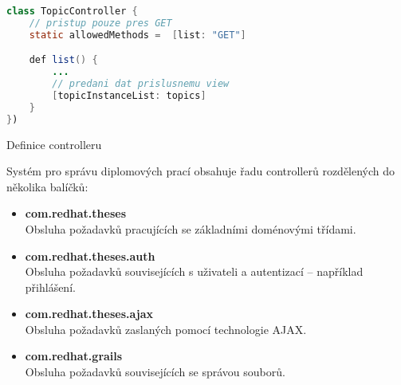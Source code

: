 \begin{example}
\centering
\begin{lstlisting}[language=Java]
class TopicController {
    // pristup pouze pres GET
    static allowedMethods =  [list: "GET"]

    def list() {
        ...
        // predani dat prislusnemu view
        [topicInstanceList: topics]
    }
})
\end{lstlisting}
\caption{Definice controlleru}
\end{example}


Systém pro správu diplomových prací obsahuje řadu controllerů rozdělených do několika balíčků:
\begin{itemize}
\item \textbf{com.redhat.theses} \\
Obsluha požadavků pracujících se základními doménovými třídami.
\item \textbf{com.redhat.theses.auth} \\
Obsluha požadavků souvisejících s uživateli a autentizací -- například přihlášení.
\item \textbf{com.redhat.theses.ajax} \\
Obsluha požadavků zaslaných pomocí technologie AJAX.
\item \textbf{com.redhat.grails} \\
Obsluha požadavků souvisejících se správou souborů.
\end{itemize}


